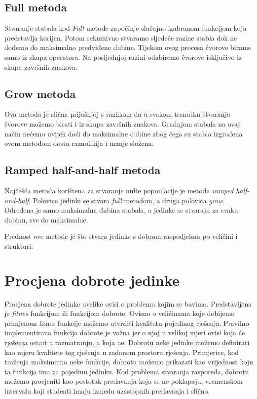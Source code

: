 \documentclass[times, utf8, zavrsni]{fer}
\begin{document}
\subsection{Full metoda}
Stvaranje stabala kod \textit{Full} metode započinje slučajno izabranom funkcijom koja predstavlja korijen. Potom rekurzivno stvaramo sljedeće razine stabla dok ne dođemo do maksimalno predviđene dubine. Tijekom ovog procesa čvorove biramo samo iz skupa operatora. Na posljednjoj razini odabiremo čvorove isključivo iz skupa završnih znakova.

\subsection{Grow metoda}
Ova metoda je slična prijašnjoj s razlikom da u svakom trenutku stvaranja čvorove možemo birati i iz skupa završnih znakova. Gradnjom stabala na ovaj način nećemo uvijek doći do maksimalne dubine zbog čega su stabla izgrađena ovom metodom dosta raznolikija i manje složena.

\subsection{Ramped half-and-half metoda}
Najčešća metoda korištena za stvaranje nulte popoulacije je metoda \textit{ramped half-and-half}. Polovica jedinki se stvara \textit{full} metodom, a druga polovica \textit{grow}. Određena je samo maksimalna dubina stabala, a jedinke se stvaraju za svaku dubinu, sve do maksimalne. 

Prednost ove metode je što stvara jedinke s dobrom raspodjelom po veličini i strukturi.
\section{Procjena dobrote jedinke}
Procjena dobrote jedinke uvelike ovisi o problemu kojim se bavimo. Predstavljena je \textit{fitnes} funkcijom ili funkcijom dobrote. Ovisno o veličinama koje dobijemo primjenom fitnes funkcije možemo utvrditi kvalitetu pojedinog rješenja. Pravilno implementirana funkcija dobrote je važna jer o njoj u velikoj mjeri ovisi koja će rješenja ostati u razmatranju, a koja ne. Dobrotu neke jedinke možemo definirati kao mjeru kvalitete tog rješenja u zadanom prostoru rješenja. Primjerice, kod traženja maksimuma neke funkcije, dobrotu možemo prikazati kao vrijednost koju ta funkcija ima za pojedinu jedinku. Kod problema stvaranja rasporeda, dobrotu možemo procjeniti kao postotak predavanja koja se ne poklapaju, vremenskom intervalu koji studenti imaju između uzastopnih predavanja i slično. 
\end{document}
